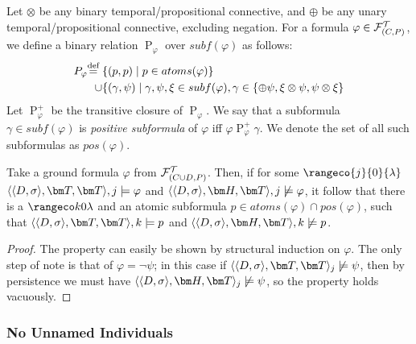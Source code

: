 \begin{definition}
  Let $\otimes$ be any binary temporal/propositional connective, and
  $\oplus$ be any unary temporal/propositional connective, excluding
  negation.  For a formula $\varphi \in \mathcal{F}_{(C,P)}^\mathcal{T}$, we define a binary
  relation $\mathrel{P}_{\varphi}$ over $subf(\varphi)$ as follows:
  \[
    \begin{aligned}
      \mathrel{P}_{\varphi} \stackrel{\text{def}}{=} \{ &(p,p) \mid p \in atoms(\varphi) \}\\
      \cup \{ &(\gamma, \psi) \mid
                  \gamma, \psi, \xi \in subf(\varphi), \gamma \in \{ \oplus \psi, \xi \otimes \psi, \psi \otimes \xi \}
    \end{aligned}
  \]
  Let $\mathrel{P}^{+}_{\varphi}$ be the transitive closure of
  $\mathrel{P}_{\varphi}$. We say that a subformula
  $\gamma \in subf(\varphi)$ is \emph{positive subformula} of
  $\varphi$ iff $\varphi \mathrel{P}^{+}_{\varphi} \gamma$. We denote
  the set of all such subformulas as $pos(\varphi)$.
\end{definition}

\begin{lemma}\label{lemma:t-not-h-atomic-subformula}
  Take a ground formula $\varphi$ from $\mathcal{F}_{(C \cup D,P)}^\mathcal{T}$. Then, if for some
  $\rangeco{j}{0}{\lambda}$\\ $\qttandt,j \models \varphi$ and
  $\qthandt,j \not\models \varphi$, it follow that there is a
  $\kinlambda$ and an atomic subformula
  $p \in atoms(\varphi) \cap pos(\varphi)$, such that
  $\qttandt,k \models p$ and $\qthandt,k \not\models p$.
\end{lemma}
\begin{proof}
  The property can easily be shown by structural induction on
  $\varphi$. The only step of note is that of $\varphi = \neg \psi$;
  in this case if $\qttandt_j \not\models \psi$, then by
  persistence we must have $\qthandt_j \not\models \psi$, so the
  property holds vacuously.
\end{proof}

\subsubsection{No Unnamed Individuals}

